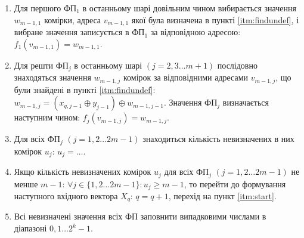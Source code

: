 \documentclass[12pt]{article}
\begin{document}
\begin{enumerate}
\item Для першого ФП$_1$ в останньому шарі довільним чином вибирається значення $w_{m-1,1}$ комірки, адреса $v_{m-1,1}$ якої була визначена в пункті \ref{itm:findundef}, і вибране значення записується в ФП$_1$ за відповідною адресою: $f_1(v_{m-1,1})=w_{m-1,1}$.
\item Для решти ФП$_j$ в останньому шарі $(j=2,3 \ldots m+1)$ послідовно знаходяться значення $w_{m-1,j}$ комірок за відповідними адресами $v_{m-1,j}$, що були знайдені в пункті \ref{itm:findundef}: $w_{m-1,j}=(x_{q,j-1} \oplus y_{j-1}) \oplus w_{m-1,j-1}$. Значення ФП$_j$ визначається наступним чином: $f_j(v_{m-1,j}) = w_{m-1,j}$.
\item Для всіх ФП$_j$ $(j=1,2 \ldots 2m-1)$ знаходиться кількість невизначених в них комірок $u_j$: $u_j= \ldots$.
\item Якщо кількість невизначених комірок $u_j$ для всіх ФП$_j$ $(j=1,2 \ldots 2m-1)$ не менше $m-1$: $\forall j \in \{1,2 \ldots 2m-1\}: u_j \geq m-1$, то перейти до формування наступного вхідного вектора $X_q$: $q=q+1$, перехід на пункт \ref{itm:start}.
\item Всі невизначені значення всіх ФП заповнити випадковими числами в діапазоні $0,1 \ldots 2^k-1$.
\end{enumerate}
\end{document}
